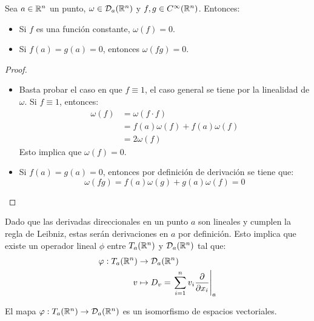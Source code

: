 \begin{lemma}\label{Lemma: Propiedades de las Derivaciones}
	Sea $a \in \mathbb{R}^n$ un punto, $\omega \in \mathcal{D}_a(\mathbb{R}^n)$ y $f,g \in C^{\infty}(\mathbb{R}^n)$. Entonces:
	\begin{itemize}
		\item Si $f$ es una función constante, $\omega(f) = 0$.
		\item Si $f(a) = g(a) = 0$, entonces $\omega(fg) = 0$.
	\end{itemize}
\end{lemma}

\begin{proof}
	\begin{itemize}
		\item Basta probar el caso en que $f \equiv 1$, el caso general se tiene por la linealidad de $\omega$. Si $f \equiv 1$, entonces:
		      \begin{align*}
			      \omega(f) & = \omega(f \cdot f)             \\
			                & = f(a)\omega(f) + f(a)\omega(f) \\
			                & = 2\omega(f)
		      \end{align*}
		      Esto implica que $\omega(f) = 0$.
		\item Si $f(a) = g(a) = 0$, entonces por definición de derivación se tiene que:
		      \[ \omega(fg)= f(a)\omega(g) + g(a)\omega(f) = 0  \]

	\end{itemize}
\end{proof}

Dado que las derivadas direccionales en un punto $a$ son lineales y cumplen la regla de Leibniz, estas serán derivaciones en $a$ por definición. Esto implica que existe un operador lineal $\phi$ entre $T_a(\mathbb{R}^n)$ y $\mathcal{D}_a(\mathbb{R}^n)$ tal que:
\begin{align*}
	\varphi: T_a(\mathbb{R}^n) & \to \mathcal{D}_a(\mathbb{R}^n)                                                                  \\
	v               & \mapsto D_v = \left. \sum_{i=1}^{n} v_i \frac{\partial}{\partial x_i} \right|_a
\end{align*}

\begin{theorem}\label{Teorema: Isomorfismo entre Espacio Tangente y Espacio de Derivaciones}
	El mapa $\varphi: T_a(\mathbb{R}^n) \to \mathcal{D}_a(\mathbb{R}^n)$ es un isomorfismo de espacios vectoriales.
\end{theorem}

